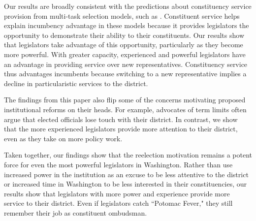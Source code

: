 \documentclass[12pt]{article}
\begin{document}
Our results are broadly consistent with the predictions about constituency service provision from multi-task selection models, such as \cite{AshworthBuenodeMesquita2006}. Constituent service helps explain incumbency advantage in these models because it provides legislators the opportunity to demonstrate their ability to their constituents. Our results show that legislators take advantage of this opportunity, particularly as they become more powerful. With greater capacity, experienced and powerful legislators have an advantage in providing service over new representatives. Constituency service thus advantages incumbents because switching to a new representative implies a decline in particularistic services to the district. 

The findings from this paper also flip some of the concerns motivating proposed institutional reforms on their heads. For example, advocates of term limits often argue that elected officials lose touch with their district. In contrast, we show that the more experienced legislators provide more attention to their district, even as they take on more policy work.  


Taken together, our findings show that the reelection motivation remains a potent force for even the most powerful legislators in Washington. Rather than use increased power in the institution as an excuse to be less attentive to the district or increased time in Washington to be less interested in their constituencies, our results show that legislators with more power and experience provide more service to their district. Even if legislators catch ``Potomac Fever," they still remember their job as constituent ombudsman. 
\end{document}
